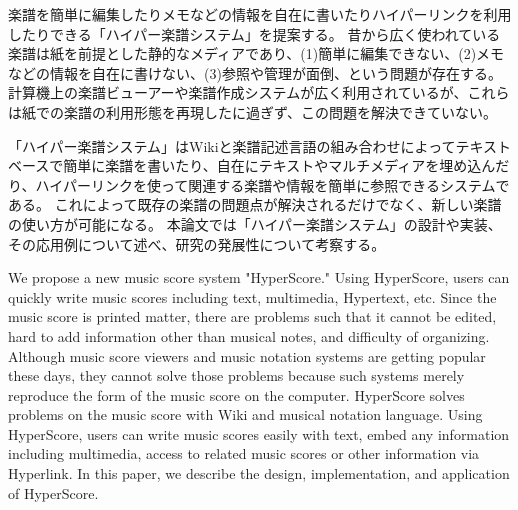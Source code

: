 


\begin{jabstract}
    楽譜を簡単に編集したりメモなどの情報を自在に書いたりハイパーリンクを利用したりできる「ハイパー楽譜システム」を提案する。
    昔から広く使われている楽譜は紙を前提とした静的なメディアであり、(1)簡単に編集できない、(2)メモなどの情報を自在に書けない、(3)参照や管理が面倒、という問題が存在する。
    計算機上の楽譜ビューアーや楽譜作成システムが広く利用されているが、これらは紙での楽譜の利用形態を再現したに過ぎず、この問題を解決できていない。

    「ハイパー楽譜システム」はWikiと楽譜記述言語の組み合わせによってテキストベースで簡単に楽譜を書いたり、自在にテキストやマルチメディアを埋め込んだり、ハイパーリンクを使って関連する楽譜や情報を簡単に参照できるシステムである。
    これによって既存の楽譜の問題点が解決されるだけでなく、新しい楽譜の使い方が可能になる。
    本論文では「ハイパー楽譜システム」の設計や実装、その応用例について述べ、研究の発展性について考察する。

\end{jabstract}



\begin{eabstract}

    We propose a new music score system "HyperScore."
    Using HyperScore, users can quickly write music scores including text, multimedia, Hypertext, etc.
    Since the music score is printed matter, there are problems such that it cannot be edited, hard to add information other than musical notes, and difficulty of organizing.
    Although music score viewers and music notation systems are getting popular these days, they cannot solve those problems because such systems merely reproduce the form of the music score on the computer.
    HyperScore solves problems on the music score with Wiki and musical notation language.
    Using HyperScore, users can write music scores easily with text, embed any information including multimedia, access to related music scores or other information via Hyperlink.
    In this paper, we describe the design, implementation, and application of HyperScore.

\end{eabstract}
